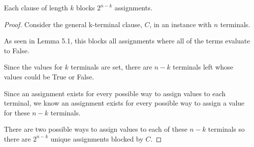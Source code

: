 \documentclass[manuscript]{acmart}
\begin{document}
        











        

    \begin{lemma}
        Each clause of length $k$ blocks $2^{n-k}$ assignments.
    \end{lemma}
    \begin{proof}
        Consider the general k-terminal clause, $C$, in an instance with
        $n$ terminals.

        As seen in Lemma 5.1, this blocks all assignments where all of the terms
        evaluate to False.

        Since the values for $k$ terminals are set, there are $n-k$ terminals left
        whose values could be True or False.

        Since an assignment exists for every possible way to assign values to
        each terminal, we know an assignment exists for every possible way to
        assign a value for these $n-k$ terminals.

        There are two possible ways to assign values to each of these $n-k$ terminals
        so there are $2^{n-k}$ unique assignments blocked by $C$.
    \end{proof}
\end{document}
